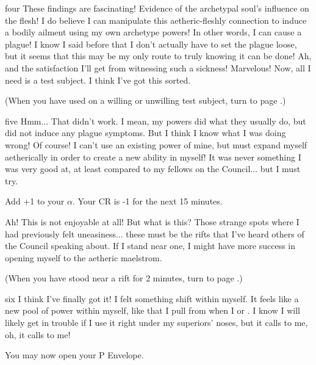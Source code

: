 \documentclass[notebook]{Silversiders} %
\begin{document}
\begin{page}{four}
These findings are fascinating! Evidence of the archetypal soul's influence on the flesh! I do believe I can manipulate this aetheric-fleshly connection to induce a bodily ailment using my own archetype powers! In other words, I can cause a plague! I know I said before that I don't actually have to set the plague loose, but it seems that this may be my only route to truly knowing it can be done! Ah, and the satisfaction I'll get from witnessing such a sickness! Marvelous! Now, all I need is a test subject. I think I've got this sorted.

(When you have used \aWither{} on a willing or unwilling test subject, turn to page .)
\end{page}

\begin{page}{five}
Hmm... That didn't work. I mean, my powers did what they usually do, but did not induce any plague symptoms. But I think I know what I was doing wrong! Of course! I can't use an existing power of mine, but must expand myself aetherically in order to create a new ability in myself! It was never something I was very good at, at least compared to my fellows on the Council... but I must try.

Add +1 to your $\alpha$. Your CR is -1 for the next 15 minutes.

Ah! This is not enjoyable at all! But what is this? Those strange spots where I had previously felt uneasiness... these must be the rifts that I've heard others of the Council speaking about. If I stand near one, I might have more success in opening myself to the aetheric maelstrom.

(When you have stood near a rift for 2 minutes, turn to page .)
\end{page}

\begin{page}{six}
I think I've finally got it! I felt something shift within myself. It feels like a new pool of power within myself, like that I pull from when I \aWither{} or \aDishearten{}. I know I will likely get in trouble if I use it right under my superiors' noses, but it calls to me, oh, it calls to me!

You may now open your P Envelope.
\end{page}

\endnotebook
\end{document}
